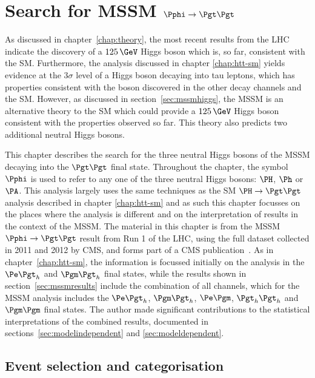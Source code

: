 \chapter{Search for MSSM $\Pphi\to\Pgt\Pgt$}
\label{chap:htt-mssm}

As discussed in chapter~\ref{chap:theory}, the most recent results from the
LHC indicate the discovery of a $125\,\GeV$ Higgs boson which is, so far, consistent with the
\ac{SM}. Furthermore, the analysis discussed in chapter \ref{chap:htt-sm} yields 
evidence at the $3\sigma$ level of a Higgs boson decaying into tau leptons, which has 
properties consistent with the boson  discovered in the other decay channels and the \ac{SM}.
However, as discussed in section~\ref{sec:mssmhiggs}, the \ac{MSSM} is an
alternative theory to the \ac{SM} which could provide a $125\,\GeV$ Higgs boson
consistent with the properties observed so far. This theory also
predicts two additional neutral Higgs bosons.

This chapter describes
the search for the three neutral Higgs bosons of the \ac{MSSM} decaying into the
$\Pgt\Pgt$ final state. Throughout the chapter, the symbol $\Pphi$ is used to refer to any one of the three
neutral Higgs bosons: $\PH$, $\Ph$ or $\PA$. This analysis largely uses the same
techniques as the \ac{SM} $\HToTauTau$ analysis described in chapter
\ref{chap:htt-sm} and as such this chapter focusses on the
places where the analysis is different and on the interpretation of results in
the context of the \ac{MSSM}. The material in this chapter is from the
\ac{MSSM} $\Pphi\to\Pgt\Pgt$ result from Run 1 of the LHC, using the full
dataset collected in 2011 and 2012 by CMS, and forms part of a CMS publication~\cite{HIG-13-021}. 
As in chapter~\ref{chap:htt-sm}, the information is focussed
initially on the analysis in the $\etau$ and $\mutau$ final states, while 
the results shown in section~\ref{sec:mssmresults} include the combination of 
all channels, which for the \ac{MSSM} analysis includes the $\etau$, $\mutau$, $\emu$, $\tautau$ and
$\mumu$ final states. The author made significant contributions to 
the statistical interpretations of the combined results, documented in 
sections~\ref{sec:modelindependent} and \ref{sec:modeldependent}. 

\section{Event selection and categorisation}
\label{sec:mssmEventSelection}

